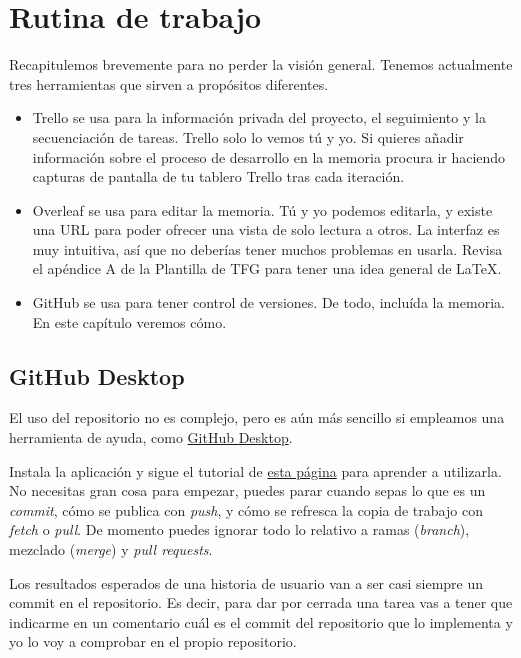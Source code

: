 \section{Rutina de trabajo}
\label{sec:rutina-tfg}

Recapitulemos brevemente para no perder la visión general.  Tenemos actualmente tres herramientas que sirven a propósitos diferentes.

\begin{itemize}
\item Trello se usa para la información privada del proyecto, el seguimiento y la secuenciación de tareas.  Trello solo lo vemos tú y yo.  Si quieres añadir información sobre el proceso de desarrollo en la memoria procura ir haciendo capturas de pantalla de tu tablero Trello tras cada iteración.
\item Overleaf se usa para editar la memoria.  Tú y yo podemos editarla, y existe una URL para poder ofrecer una vista de solo lectura a otros.  La interfaz es muy intuitiva, así que no deberías tener muchos problemas en usarla.  Revisa el apéndice A de la Plantilla de TFG para tener una idea general de \LaTeX{}.
\item GitHub se usa para tener control de versiones.  De todo, incluída la memoria.  En este capítulo veremos cómo.
\end{itemize}

\subsection{GitHub Desktop}
\label{sec:github-desktop}

El uso del repositorio no es complejo, pero es aún más sencillo si empleamos una herramienta de ayuda, como \href{https://desktop.github.com/}{GitHub Desktop}.  

Instala la aplicación y sigue el tutorial de \href{https://programminghistorian.org/es/lecciones/introduccion-control-versiones-github-desktop}{esta página} para aprender a utilizarla.  No necesitas gran cosa para empezar, puedes parar cuando sepas lo que es un \emph{commit}, cómo se publica con \emph{push}, y cómo se refresca la copia de trabajo con \emph{fetch} o \emph{pull}.  De momento puedes ignorar todo lo relativo a ramas (\emph{branch}), mezclado (\emph{merge}) y \emph{pull requests}.

Los resultados esperados de una historia de usuario van a ser casi siempre un commit en el repositorio.  Es decir, para dar por cerrada una tarea vas a tener que indicarme en un comentario cuál es el commit del repositorio que lo implementa y yo lo voy a comprobar en el propio repositorio.

